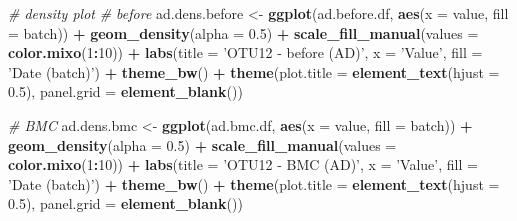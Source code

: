 \documentclass[]{book}
\newenvironment{Shaded}{\begin{snugshade}}{\end{snugshade}}
\newcommand{\KeywordTok}[1]{\textcolor[rgb]{0.13,0.29,0.53}{\textbf{#1}}}
\newcommand{\DataTypeTok}[1]{\textcolor[rgb]{0.13,0.29,0.53}{#1}}
\newcommand{\DecValTok}[1]{\textcolor[rgb]{0.00,0.00,0.81}{#1}}
\newcommand{\FloatTok}[1]{\textcolor[rgb]{0.00,0.00,0.81}{#1}}
\newcommand{\StringTok}[1]{\textcolor[rgb]{0.31,0.60,0.02}{#1}}
\newcommand{\CommentTok}[1]{\textcolor[rgb]{0.56,0.35,0.01}{\textit{#1}}}
\newcommand{\OperatorTok}[1]{\textcolor[rgb]{0.81,0.36,0.00}{\textbf{#1}}}
\newcommand{\NormalTok}[1]{#1}
\begin{document}
\begin{Shaded}
\begin{Highlighting}[]
\CommentTok{# density plot}
\CommentTok{# before}
\NormalTok{ad.dens.before <-}\StringTok{ }\KeywordTok{ggplot}\NormalTok{(ad.before.df, }\KeywordTok{aes}\NormalTok{(}\DataTypeTok{x =}\NormalTok{ value, }\DataTypeTok{fill =}\NormalTok{ batch)) }\OperatorTok{+}\StringTok{ }
\StringTok{  }\KeywordTok{geom_density}\NormalTok{(}\DataTypeTok{alpha =} \FloatTok{0.5}\NormalTok{) }\OperatorTok{+}\StringTok{ }\KeywordTok{scale_fill_manual}\NormalTok{(}\DataTypeTok{values =} \KeywordTok{color.mixo}\NormalTok{(}\DecValTok{1}\OperatorTok{:}\DecValTok{10}\NormalTok{)) }\OperatorTok{+}\StringTok{ }
\StringTok{  }\KeywordTok{labs}\NormalTok{(}\DataTypeTok{title =} \StringTok{'OTU12 - before (AD)'}\NormalTok{, }\DataTypeTok{x =} \StringTok{'Value'}\NormalTok{, }\DataTypeTok{fill =} \StringTok{'Date (batch)'}\NormalTok{) }\OperatorTok{+}\StringTok{ }
\StringTok{  }\KeywordTok{theme_bw}\NormalTok{() }\OperatorTok{+}\StringTok{ }\KeywordTok{theme}\NormalTok{(}\DataTypeTok{plot.title =} \KeywordTok{element_text}\NormalTok{(}\DataTypeTok{hjust =} \FloatTok{0.5}\NormalTok{), }
                     \DataTypeTok{panel.grid =} \KeywordTok{element_blank}\NormalTok{())}

\CommentTok{# BMC}
\NormalTok{ad.dens.bmc <-}\StringTok{ }\KeywordTok{ggplot}\NormalTok{(ad.bmc.df, }\KeywordTok{aes}\NormalTok{(}\DataTypeTok{x =}\NormalTok{ value, }\DataTypeTok{fill =}\NormalTok{ batch)) }\OperatorTok{+}\StringTok{ }
\StringTok{  }\KeywordTok{geom_density}\NormalTok{(}\DataTypeTok{alpha =} \FloatTok{0.5}\NormalTok{) }\OperatorTok{+}\StringTok{ }\KeywordTok{scale_fill_manual}\NormalTok{(}\DataTypeTok{values =} \KeywordTok{color.mixo}\NormalTok{(}\DecValTok{1}\OperatorTok{:}\DecValTok{10}\NormalTok{)) }\OperatorTok{+}\StringTok{ }
\StringTok{  }\KeywordTok{labs}\NormalTok{(}\DataTypeTok{title =} \StringTok{'OTU12 - BMC (AD)'}\NormalTok{, }\DataTypeTok{x =} \StringTok{'Value'}\NormalTok{, }\DataTypeTok{fill =} \StringTok{'Date (batch)'}\NormalTok{) }\OperatorTok{+}\StringTok{ }
\StringTok{  }\KeywordTok{theme_bw}\NormalTok{() }\OperatorTok{+}\StringTok{ }\KeywordTok{theme}\NormalTok{(}\DataTypeTok{plot.title =} \KeywordTok{element_text}\NormalTok{(}\DataTypeTok{hjust =} \FloatTok{0.5}\NormalTok{), }
                     \DataTypeTok{panel.grid =} \KeywordTok{element_blank}\NormalTok{())}



\end{Highlighting}
\end{Shaded}
\end{document}
